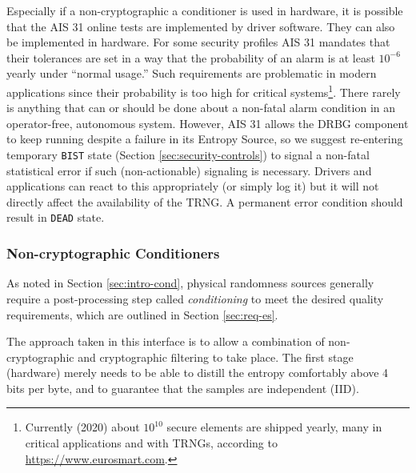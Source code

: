     Especially if a non-cryptographic a conditioner is used in hardware,
    it is possible that the AIS 31 \cite{KiSc11} online tests are
    implemented by driver software. They can also be implemented in hardware.
    For some security profiles AIS 31 mandates that their tolerances are
    set in a way that the probability of an alarm is at least $10^{-6}$
    yearly under ``normal usage.'' Such requirements are problematic
    in modern applications since their probability is too high for
    critical systems\footnote{Currently (2020) about $10^{10}$ secure
    elements are shipped yearly, many in critical applications and with
    TRNGs, according to \url{https://www.eurosmart.com}.}.
    There rarely is anything that can or should be done about a non-fatal
    alarm condition in an operator-free, autonomous system. However,
    AIS 31 allows the DRBG component to keep running despite a failure in
    its Entropy Source, so we suggest re-entering temporary \verb|BIST|
    state (Section \ref{sec:security-controls}) to signal a non-fatal
    statistical error if such (non-actionable) signaling is necessary.
    Drivers and applications can react to this appropriately (or simply
    log it) but it will not directly affect the availability of the TRNG.
    A permanent error condition should result in \verb|DEAD| state.

\subsubsection{Non-cryptographic Conditioners}
\label{sec:noncrypto}

    As noted in Section \ref{sec:intro-cond}, physical randomness sources
    generally require a post-processing step called \emph{conditioning} to
    meet the desired quality requirements, which  are outlined in Section
    \ref{sec:req-es}.

    The approach taken in this interface is to allow a combination of
    non-cryptographic and cryptographic filtering to take place. The
    first stage (hardware) merely needs to be able to distill the entropy
    comfortably above 4 bits per byte, and to guarantee that the samples
    are independent (IID).

